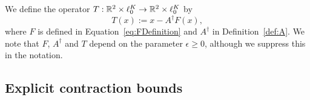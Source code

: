 \begin{definition}
We define the operator $ T: \mathbb{R}^2 \times \ell^K_0 \to \mathbb{R}^2 \times \ell^K_0 $ by
\begin{equation*}
	T(x) :=  x - A^{\dagger} F(x) ,
\end{equation*}
	where  $F$ is defined in Equation~\eqref{eq:FDefinition}  and $A^{\dagger}$ in Definition~\ref{def:A}.
	We note that $F$, $A^{\dagger}$ and $T$ depend on the parameter $\epsilon \geq 0$, although we suppress this in the notation.
\end{definition}

%


\subsection{Explicit contraction bounds}
\label{s:contraction}


